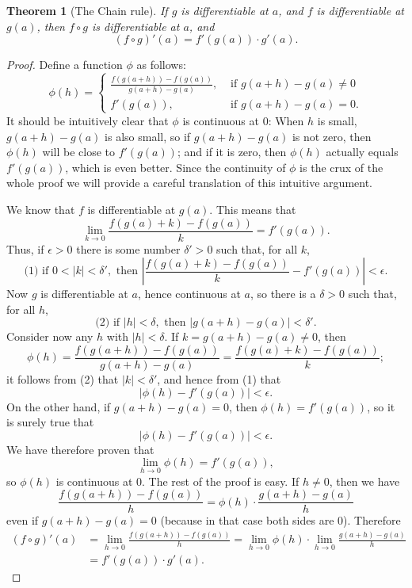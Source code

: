 \documentclass{article}
\newtheorem{theorem}{Theorem}
\begin{document}
\begin{theorem}[The Chain rule]
  If $g$ is differentiable at $a$, and $f$ is differentiable at $g(a)$, then $f
  \circ g$ is differentiable at $a$, and \[
    (f \circ g)'(a) = f'(g(a)) \cdot g'(a).
  \]
\end{theorem}
\begin{proof}
  Define a function $\phi$ as follows: \[
    \phi(h) =
    \begin{cases}
      \frac{f(g(a + h)) - f(g(a))}{g(a + h) - g(a)}, &\text{ if } g(a + h) -
      g(a) \neq 0 \\
      f'(g(a)), &\text{ if } g(a + h) - g(a) = 0.
    \end{cases}
  \] It should be intuitively clear that $\phi$ is continuous at 0: When $h$ is
  small, $g(a + h) - g(a)$ is also small, so if $g(a + h) - g(a)$ is not zero,
  then $\phi(h)$ will be close to $f'(g(a))$; and if it is zero, then $\phi(h)$
  actually equals $f'(g(a))$, which is even better. Since the continuity of
  $\phi$ is the crux of the whole proof we will provide a careful translation
  of this intuitive argument.

  We know that $f$ is differentiable at $g(a)$. This means that \[
    \lim_{k \to 0} \frac{f(g(a) + k) - f(g(a))}{k} = f'(g(a)).
  \] Thus, if $\epsilon > 0$ there is some number $\delta' > 0$ such that, for
  all $k$, \[
    \text{(1) if } 0 < |k| < \delta',
    \text{ then } \left| \frac{f(g(a) + k) - f(g(a))}{k} - f'(g(a)) \right|
    < \epsilon.
  \]
  Now $g$ is differentiable at $a$, hence continuous at $a$, so there is a
  $\delta > 0$ such that, for all $h$, \[
    \text{(2) if } |h| < \delta, \text{ then } |g(a + h) - g(a)| < \delta'.
  \] Consider now any $h$ with $|h| < \delta$. If $k = g(a + h) - g(a) \neq 0$,
  then \[
    \phi(h)
    = \frac{f(g(a + h)) - f(g(a))}{g(a + h) - g(a)}
    = \frac{f(g(a) + k) - f(g(a))}{k};
  \] it follows from (2) that $|k| < \delta'$, and hence from (1) that \[
    |\phi(h) - f'(g(a))| < \epsilon.
  \] On the other hand, if $g(a + h) - g(a) = 0$, then $\phi(h) = f'(g(a))$, so
  it is surely true that \[
    |\phi(h) - f'(g(a))| < \epsilon.
    \] We have therefore proven that \[
    \lim_{h \to 0} \phi(h) = f'(g(a)),
  \] so $\phi(h)$ is continuous at 0. The rest of the proof is easy. If $h \neq
  0$, then we have \[
    \frac{f(g(a + h)) - f(g(a))}{h} = \phi(h) \cdot \frac{g(a + h) - g(a)}{h}
  \] even if $g(a + h) - g(a) = 0$ (because in that case both sides are 0).
  Therefore \begin{align*}
    (f \circ g)'(a)
    &= \lim_{h \to 0} \frac{f(g(a + h)) - f(g(a))}{h}
    = \lim_{h \to 0} \phi(h) \cdot \lim_{h \to 0} \frac{g(a + h) - g(a)}{h} \\
    &= f'(g(a)) \cdot g'(a).
  \end{align*}
\end{proof}
\end{document}
